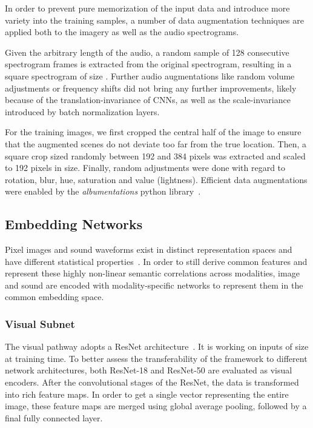 \documentclass[journal]{IEEEtran}
\begin{document}
In order to prevent pure memorization of the input data and
introduce more variety into the training samples,
a number of data augmentation techniques are applied both to the
imagery as well as the audio spectrograms.

Given the arbitrary length of the audio,
a random sample of 128 consecutive spectrogram frames is extracted
from the original spectrogram, resulting in a square spectrogram of size .
Further audio augmentations like random volume adjustments or frequency shifts did not
bring any further improvements,
likely because of the translation-invariance of CNNs,
as well as the scale-invariance introduced by batch normalization layers.

For the training images,
we first cropped the central half of the image to ensure that the augmented scenes
do not deviate too far from the true location.
Then, a square crop sized randomly between 192 and 384 pixels was extracted
and scaled to 192 pixels in size.
Finally, random adjustments were done with regard to
rotation, blur, hue, saturation and value (lightness).
Efficient data augmentations were enabled by the \emph{albumentations}
python library~\cite{albumentations}.

\subsection{Embedding Networks}
Pixel images and sound waveforms exist in distinct representation spaces and have different
statistical properties~\cite{srivastava2014multimodal}.
In order to still derive common features and represent these highly non-linear
semantic correlations across modalities,
image and sound are encoded with modality-specific networks to represent them in
the common embedding space.

\subsubsection{Visual Subnet}
The visual pathway adopts a ResNet architecture~\cite{he2016deep}.
It is working on inputs of size  at training time.
To better assess the transferability of the framework to different network architectures,
both ResNet-18 and ResNet-50 are evaluated as visual encoders.
After the convolutional stages of the ResNet,
the data is transformed into rich feature maps.
In order to get a single vector representing the entire
image, these feature maps are merged using
global average pooling,
followed by a final fully connected layer.
\end{document}
